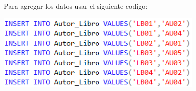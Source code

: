 \documentclass[12pt,letterpaper]{article}
\newcommand\tab[1][1cm]{\hspace*{#1}}
\begin{document}
\begin{enumerate}[\tab 1.]
\begin{itemize}
\begin{center}
            \end{center}
            Para agregar los datos usar el siguiente codigo:
            \begin{center}
                \includegraphics[width=10cm]{./img/img6.1.png}
            \end{center}
        \end{itemize}
    \end{enumerate}
\end{document}
